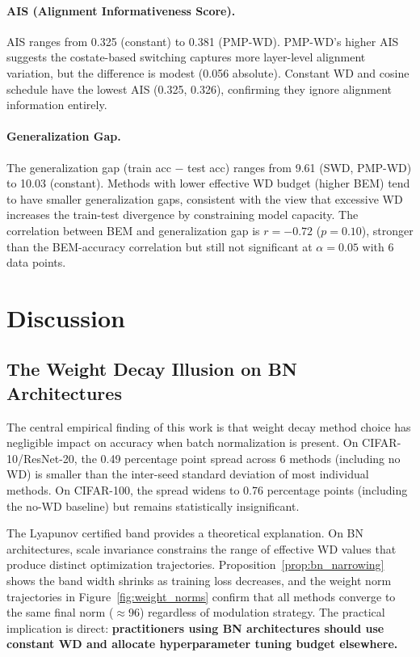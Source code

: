 \documentclass{article}
\begin{document}
\paragraph{AIS (Alignment Informativeness Score).} AIS ranges from 0.325 (constant) to 0.381 (PMP-WD). PMP-WD's higher AIS suggests the costate-based switching captures more layer-level alignment variation, but the difference is modest (0.056 absolute). Constant WD and cosine schedule have the lowest AIS (0.325, 0.326), confirming they ignore alignment information entirely.

\paragraph{Generalization Gap.} The generalization gap (train acc $-$ test acc) ranges from 9.61 (SWD, PMP-WD) to 10.03 (constant). Methods with lower effective WD budget (higher BEM) tend to have smaller generalization gaps, consistent with the view that excessive WD increases the train-test divergence by constraining model capacity. The correlation between BEM and generalization gap is $r = -0.72$ ($p = 0.10$), stronger than the BEM-accuracy correlation but still not significant at $\alpha = 0.05$ with 6 data points.

\section{Discussion}
\label{sec:discussion}

\subsection{The Weight Decay Illusion on BN Architectures}

The central empirical finding of this work is that weight decay method choice has negligible impact on accuracy when batch normalization is present. On CIFAR-10/ResNet-20, the 0.49 percentage point spread across 6 methods (including no WD) is smaller than the inter-seed standard deviation of most individual methods. On CIFAR-100, the spread widens to 0.76 percentage points (including the no-WD baseline) but remains statistically insignificant.

The Lyapunov certified band provides a theoretical explanation. On BN architectures, scale invariance constrains the range of effective WD values that produce distinct optimization trajectories. Proposition~\ref{prop:bn_narrowing} shows the band width shrinks as training loss decreases, and the weight norm trajectories in Figure~\ref{fig:weight_norms} confirm that all methods converge to the same final norm ($\approx 96$) regardless of modulation strategy. The practical implication is direct: \textbf{practitioners using BN architectures should use constant WD and allocate hyperparameter tuning budget elsewhere.}
\end{document}
